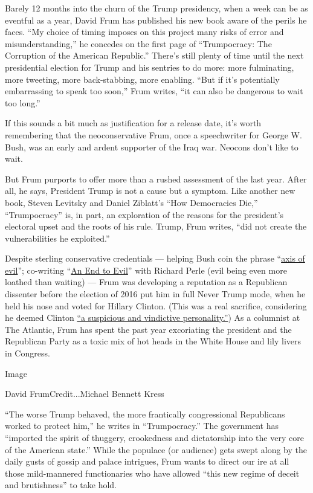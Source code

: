 Barely 12 months into the churn of the Trump presidency, when a week can
be as eventful as a year, David Frum has published his new book aware of
the perils he faces. ``My choice of timing imposes on this project many
risks of error and misunderstanding,'' he concedes on the first page of
``Trumpocracy: The Corruption of the American Republic.'' There's still
plenty of time until the next presidential election for Trump and his
sentries to do more: more fulminating, more tweeting, more
back-stabbing, more enabling. ``But if it's potentially embarrassing to
speak too soon,'' Frum writes, ``it can also be dangerous to wait too
long.''

If this sounds a bit much as justification for a release date, it's
worth remembering that the neoconservative Frum, once a speechwriter for
George W. Bush, was an early and ardent supporter of the Iraq war.
Neocons don't like to wait.

But Frum purports to offer more than a rushed assessment of the last
year. After all, he says, President Trump is not a cause but a symptom.
Like another new book, Steven Levitsky and Daniel Ziblatt's ``How
Democracies Die,'' ``Trumpocracy'' is, in part, an exploration of the
reasons for the president's electoral upset and the roots of his rule.
Trump, Frum writes, ``did not create the vulnerabilities he exploited.''

Despite sterling conservative credentials --- helping Bush coin the
phrase
``\href{http://www.nytimes3xbfgragh.onion/2003/01/20/us/white-house-letter-axis-of-evil-first-birthday-for-a-famous-phrase.html}{axis
of evil}''; co-writing
``\href{http://www.nytimes3xbfgragh.onion/2004/02/08/books/showing-them-who-s-boss.html}{An
End to Evil}'' with Richard Perle (evil being even more loathed than
waiting) --- Frum was developing a reputation as a Republican dissenter
before the election of 2016 put him in full Never Trump mode, when he
held his nose and voted for Hillary Clinton. (This was a real sacrifice,
considering he deemed Clinton
\href{https://www.theatlantic.com/politics/archive/2016/11/dont-gamble-on-trump/506207/}{``a
suspicious and vindictive personality.''}) As a columnist at The
Atlantic, Frum has spent the past year excoriating the president and the
Republican Party as a toxic mix of hot heads in the White House and lily
livers in Congress.

Image

David FrumCredit...Michael Bennett Kress

``The worse Trump behaved, the more frantically congressional
Republicans worked to protect him,'' he writes in ``Trumpocracy.'' The
government has ``imported the spirit of thuggery, crookedness and
dictatorship into the very core of the American state.'' While the
populace (or audience) gets swept along by the daily gusts of gossip and
palace intrigues, Frum wants to direct our ire at all those
mild-mannered functionaries who have allowed ``this new regime of deceit
and brutishness'' to take hold.

